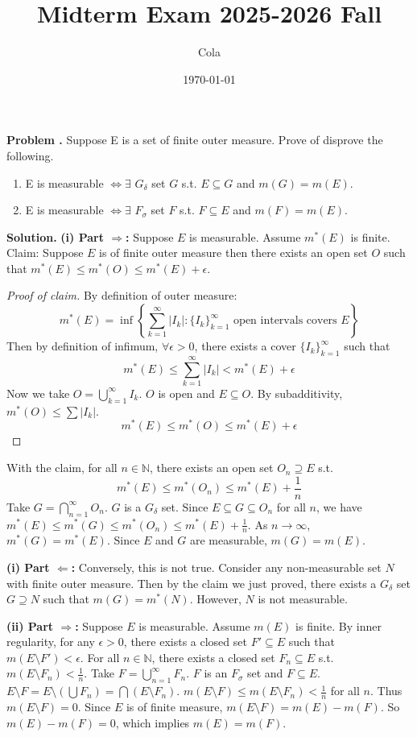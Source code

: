 \documentclass[12pt, a4paper, oneside]{article}
\title{\textbf{Midterm Exam 2025-2026 Fall}}
\author{Cola}
\date{\today}
\newcounter{problemname}
\newenvironment{problem}
  {\begin{shaded}\stepcounter{problemname}\par\noindent\textbf{Problem \arabic{problemname}.
}\newline}
  {\end{shaded}\par}
\newenvironment{solution}
  {\par\noindent\textbf{Solution. }\newline}
  {\par}
\begin{document}
\maketitle


\begin{problem}
Suppose E is a set of finite outer measure. Prove of disprove the following.
\begin{enumerate}
    \item E is measurable $\iff \exists$ $G_{\delta}$ set $G$ s.t.
$E \subseteq G$ and $m(G) = m(E)$. 
    \item E is measurable $\iff \exists$ $F_{\sigma}$ set $F$ s.t. $F \subseteq E$ and $m(F) = m(E)$.
\end{enumerate}
\end{problem}

\begin{solution}
\textbf{(i) Part $\Rightarrow$:}
Suppose $E$ is measurable.
Assume $m^*(E)$ is finite.
Claim: Suppose $E$ is of finite outer measure then there exists an open set $O$ such that $m^*(E) \le m^*(O) \le m^*(E) + \epsilon$.
\begin{proof}[Proof of claim]
By definition of outer measure:
$$ m^*(E) = \inf \left\{ \sum_{k=1}^\infty |I_k| : \{I_k\}_{k=1}^\infty \text{ open intervals covers } E \right\} $$
Then by definition of infimum, $\forall \epsilon > 0$, there exists a cover $\{I_k\}_{k=1}^\infty$ such that
$$ m^*(E) \le \sum_{k=1}^\infty |I_k| < m^*(E) + \epsilon $$
Now we take $O = \bigcup_{k=1}^\infty I_k$. $O$ is open and $E \subseteq O$. By subadditivity, $m^*(O) \le \sum |I_k|$.
$$ m^*(E) \le m^*(O) \le m^*(E) + \epsilon $$
\end{proof}
With the claim, for all $n \in \mathbb{N}$, there exists an open set $O_n \supseteq E$ s.t.
$$ m^*(E) \le m^*(O_n) \le m^*(E) + \frac{1}{n} $$
Take $G = \bigcap_{n=1}^\infty O_n$. $G$ is a $G_\delta$ set.
Since $E \subseteq G \subseteq O_n$ for all $n$, we have $m^*(E) \le m^*(G) \le m^*(O_n) \le m^*(E) + \frac{1}{n}$.
As $n \to \infty$, $m^*(G) = m^*(E)$. Since $E$ and $G$ are measurable, $m(G) = m(E)$.

\noindent \textbf{(i) Part $\Leftarrow$:}
Conversely, this is not true.
Consider any non-measurable set $N$ with finite outer measure.
Then by the claim we just proved, there exists a $G_\delta$ set $G \supseteq N$ such that $m(G) = m^*(N)$.
However, $N$ is not measurable.

\vspace{1em}
\noindent \textbf{(ii) Part $\Rightarrow$:}
Suppose $E$ is measurable.
Assume $m(E)$ is finite. By inner regularity, for any $\epsilon > 0$, there exists a closed set $F' \subseteq E$ such that $m(E \setminus F') < \epsilon$.
For all $n \in \mathbb{N}$, there exists a closed set $F_n \subseteq E$ s.t. $m(E \setminus F_n) < \frac{1}{n}$.
Take $F = \bigcup_{n=1}^\infty F_n$. $F$ is an $F_\sigma$ set and $F \subseteq E$.
$E \setminus F = E \setminus (\bigcup F_n) = \bigcap (E \setminus F_n)$.
$m(E \setminus F) \le m(E \setminus F_n) < \frac{1}{n}$ for all $n$.
Thus $m(E \setminus F) = 0$.
Since $E$ is of finite measure, $m(E \setminus F) = m(E) - m(F)$.
So $m(E) - m(F) = 0$, which implies $m(E) = m(F)$.


\end{solution}
\end{document}
